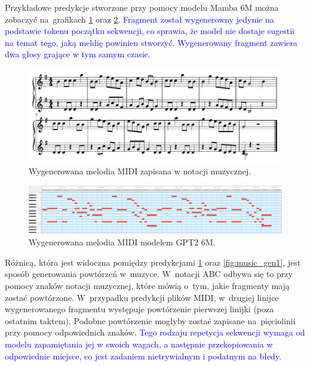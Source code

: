 \documentclass[data-science]{agh-wi} %
\begin{document}
Przykładowe predykcje stworzone przy pomocy modelu Mamba 6M można zobaczyć na~grafikach \ref*{fig:music_genMIDI_notes} oraz \ref*{fig:music_genMIDI}. \textcolor{blue}{Fragment został wygenerowny jedynie na podstawie tokenu początku sekwencji, co sprawia, że model nie dostaje sugestii na temat tego, jaką meldię powinien stworzyć. Wygenerowany fragment zawiera dwa głosy grające w tym samym czasie.}

\begin{figure}[ht!]
    \begin{center}
        \includegraphics[width=0.9\linewidth]{./img/35.pdf}
    \end{center}
    \caption{Wygenerowana melodia MIDI zapisana w notacji muzycznej.}\label{fig:music_genMIDI_notes}
\end{figure}

\begin{figure}[ht!]
    \begin{center}
        \includegraphics[width=0.9\linewidth]{./img/midi_generated.png}
    \end{center}
    \caption{Wygenerowana melodia MIDI modelem GPT2 6M.}\label{fig:music_genMIDI}
\end{figure}

Różnicą, która jest widoczna pomiędzy predykcjami \ref*{fig:music_genMIDI_notes} oraz \ref*{fig:music_gen1}, jest sposób generowania powtórzeń w~muzyce. W~notacji ABC odbywa się to przy pomocy znaków notacji muzycznej, które mówią o~tym, jakie fragmenty mają zostać powtórzone. W~przypadku predykcji plików MIDI, w~drugiej linijce wygenerowanego fragmentu występuje powtórzenie pierwszej linijki (poza ostatnim taktem). Podobne powtórzenie mogłyby zostać zapisane na~pięciolinii przy pomocy odpowiednich znaków. \textcolor{blue}{Tego rodzaju repetycja sekwencji wymaga od modelu zapamiętania jej w swoich wagach, a następnie przekopiowania w odpowiednie miejsce, co jest zadaniem nietrywialnym i podatnym na błedy.}
\end{document}
